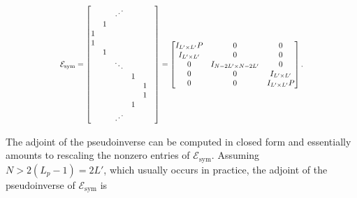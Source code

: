 \documentclass[journal]{IEEEtran}
\newcommand\scalemath[2]{\scalebox{#1}{\mbox{\ensuremath{\displaystyle #2}}}}
\begin{document}
\[ \scalemath{0.8}{\mathcal{E}_\text{sym} = \begin{bmatrix} & & \iddots & & &\\ & 1 &&&&\\ 1&&&&&\\1&&&&\\&1&&&&\\&&\ddots&&&\\&&&1&\\&&&&1\\&&&&1\\&&&1&\\&&\iddots&&\end{bmatrix} = \begin{bmatrix}I_{L'\times L'}P & 0 & 0\\I_{L'\times L'} & 0 & 0\\0 & I_{N-2L'\times N-2L'} & 0\\0&0&I_{L'\times L'}\\0&0&I_{L'\times L'}P\end{bmatrix}.} \]

\noindent The adjoint of the pseudoinverse can be computed in closed form and essentially amounts to rescaling the nonzero entries of $\mathcal{E}_\text{sym}$.  Assuming $N > 2(L_p-1)=2L'$, which usually occurs in practice, the adjoint of the  pseudoinverse of $\mathcal{E}_\text{sym}$ is 
\end{document}
